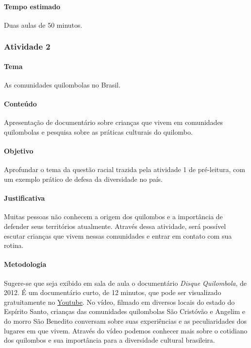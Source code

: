 \documentclass[11pt]{extarticle}
\begin{document}
\paragraph{Tempo estimado} Duas aulas de 50 minutos.

\subsubsection{Atividade 2}


\paragraph{Tema} As comunidades quilombolas no Brasil.

\paragraph{Conteúdo} Apresentação de documentário sobre crianças que vivem em comunidades quilombolas e pesquisa sobre as práticas culturais do quilombo.

\paragraph{Objetivo} Aprofundar o tema da questão racial trazida pela atividade 1 de pré-leitura, com um exemplo prático de defesa da diversidade no país.

\paragraph{Justificativa} Muitas pessoas não conhecem a origem dos quilombos e a importância de defender seus territórios atualmente. Através dessa atividade, será possível escutar crianças que vivem nessas comunidades e entrar em contato com sua rotina. 

\paragraph{Metodologia} Sugere-se que seja exibido em sala de aula o documentário \textit{Disque Quilombola}, de 2012. É um documentário curto, de 12 minutos, que pode ser visualizado gratuitamente no \href{https://youtu.be/GStv-f_bcfU}{Youtube}. No vídeo, filmado em diversos locais do estado do Espírito Santo, crianças das comunidades quilombolas São Cristóvão e Angelim e do morro São Benedito conversam sobre suas experiências e as peculiaridades dos lugares em que vivem. Através do vídeo podemos conhecer mais sobre o cotidiano dos quilombos e sua importância para a diversidade cultural brasileira. 
\end{document}

